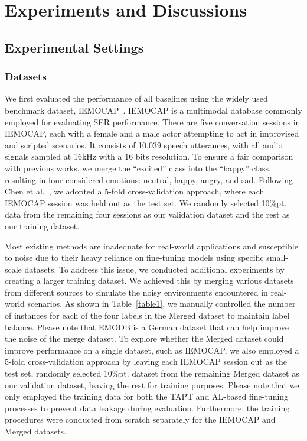 \documentclass{article}
\begin{document}
\section{Experiments and  Discussions}
\label{sec:pagestyle}

\subsection{Experimental Settings}
\label{subsection_experiment}



\subsubsection{Datasets}

We first evaluated the performance of all baselines using the widely used benchmark dataset, IEMOCAP~\cite{BussoBLKMKCLN08}. IEMOCAP is a multimodal database commonly employed for evaluating SER performance. There are five conversation sessions in IEMOCAP, each with a female and a male actor attempting to act in improvised and scripted scenarios. It consists of 10,039 speech utterances, with all audio signals sampled at 16kHz with a 16 bits resolution.
%
To ensure a fair comparison with previous works, we merge the ``excited'' class into the ``happy'' class, resulting in four considered emotions: neutral, happy, angry, and sad. Following Chen et al.~\cite{2110-06309}, we adopted a 5-fold cross-validation approach, where each IEMOCAP session was held out as the test set. We randomly selected 10\%pt. data from the remaining four sessions as our validation dataset and the rest as our training dataset.


Most existing methods are inadequate for real-world applications and susceptible to noise due to their heavy reliance on fine-tuning models using specific small-scale datasets. To address this issue, we conducted additional experiments by creating a larger training dataset. We achieved this by merging various datasets from different sources to simulate the noisy environments encountered in real-world scenarios. 
%
As shown in Table~\ref{table1}, we manually controlled the number of instances for each of the four labels in the Merged dataset to maintain label balance. 
Please note that EMODB is a German dataset that can help improve the noise of the merge dataset.
To explore whether the Merged dataset could improve performance on a single dataset, such as IEMOCAP, we also employed a 5-fold cross-validation approach by leaving each IEMOCAP session out as the test set, randomly selected 10\%pt. dataset from the remaining Merged dataset as our validation dataset, leaving the rest for training purposes.
%
Please note that we only employed the training data for both the TAPT and AL-based fine-tuning processes to prevent data leakage during evaluation. Furthermore, the training procedures were conducted from scratch separately for the IEMOCAP and Merged datasets.
\end{document}
